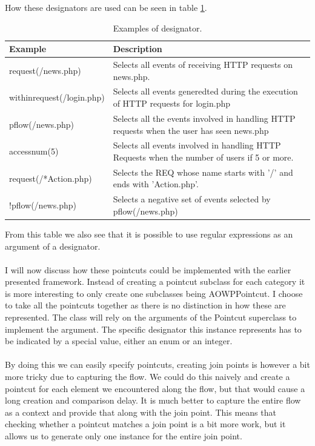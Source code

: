 \documentclass[a4paper]{report}
\begin{document}
How these designators are used can be seen in table \ref{tab:Designators_AOWP_Pointcut}.
\begin{table}
\centering
\begin{tabular}{l|p{7cm}}
\hline
Example & Description\\
\hline
\hline
request(/news.php) & Selects all events of receiving HTTP requests on news.php.\\
\hline
withinrequest(/login.php) & Selects all events generedted during the execution of HTTP requests for login.php\\
\hline
pflow(/news.php) & Selects all the events involved in handling HTTP requests when the user has seen news.php\\
\hline
accessnum(5) & Selects all events involved in handling HTTP Requests when the number of users if 5 or more.\\
\hline
request(/*Action.php) & Selects the REQ whose name starts with '/' and ends with 'Action.php'.\\
\hline
!pflow(/news.php) & Selects a negative set of events selected by pflow(/news.php)\\
\hline
\end{tabular}
\caption{Examples of designator.}
\label{tab:Designators_AOWP_Pointcut}
\end{table}
From this table we also see that it is possible to use regular expressions as an argument of a designator.\\
\\
I will now discuss how these pointcuts could be implemented with the earlier presented framework. Instead of creating a pointcut subclass for each category it is more interesting to only create one subclasses being AOWPPointcut. I choose to take all the pointcuts together as there is no distinction in how these are represented. The class will rely on the arguments of the Pointcut superclass to implement the argument. The specific designator this instance represents has to be indicated by a special value, either an enum or an integer.\\
\\
By doing this we can easily specify pointcuts, creating join points is however a bit more tricky due to capturing the flow. We could do this naively and create a pointcut for each element we encountered along the flow, but that would cause a long creation and comparison delay. It is much better to capture the entire flow as a context and provide that along with the join point. This means that checking whether a pointcut matches a join point is a bit more work, but it allows us to generate only one instance for the entire join point.\\
\end{document}
